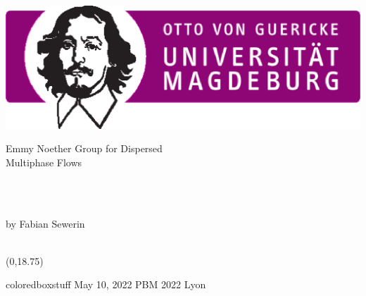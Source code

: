 \documentclass[10pt,xcolor=dvipsnames]{beamer}
\begin{document}

\begin{frame}[t]

\includegraphics[width=0.3\columnwidth]{fig/ovgu-crop_fvst.eps}\qquad
\parbox[b][1cm][t]{0.6\columnwidth}{Emmy Noether Group for Dispersed\\Multiphase Flows}\hfill\mbox{}\\
\begin{center}
 \\[0\baselineskip]
by Fabian Sewerin\\[0.5\baselineskip]
\resizebox{\columnwidth}{!}{}\\
\end{center}

\begin{textblock}{20}(0,18.75)
\begin{beamercolorbox}[wd=\paperwidth,sep=0.5em]{coloredboxstuff}
\small May 10, 2022 \hfill PBM 2022 Lyon \\\mbox{}
\end{beamercolorbox}
\end{textblock}

\end{frame}



\end{document}
